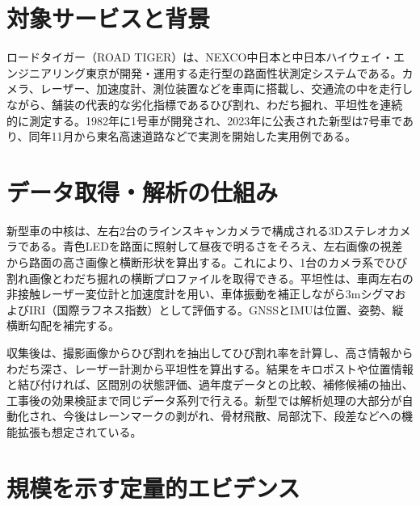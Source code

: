 \documentclass[8pt,a4paper,twocolumn]{ltjsarticle}
\begin{document}

\section{対象サービスと背景}

ロードタイガー（ROAD TIGER）は、NEXCO中日本と中日本ハイウェイ・エンジニアリング東京が開発・運用する走行型の路面性状測定システムである。カメラ、レーザー、加速度計、測位装置などを車両に搭載し、交通流の中を走行しながら、舗装の代表的な劣化指標であるひび割れ、わだち掘れ、平坦性を連続的に測定する。1982年に1号車が開発され、2023年に公表された新型は7号車であり、同年11月から東名高速道路などで実測を開始した実用例である\cite{nexco2023}。

\section{データ取得・解析の仕組み}

新型車の中核は、左右2台のラインスキャンカメラで構成される3Dステレオカメラである。青色LEDを路面に照射して昼夜で明るさをそろえ、左右画像の視差から路面の高さ画像と横断形状を算出する。これにより、1台のカメラ系でひび割れ画像とわだち掘れの横断プロファイルを取得できる。平坦性は、車両左右の非接触レーザー変位計と加速度計を用い、車体振動を補正しながら3mシグマおよびIRI（国際ラフネス指数）として評価する。GNSSとIMUは位置、姿勢、縦横断勾配を補完する\cite{catalog2025,roadtigerpdf}。

収集後は、撮影画像からひび割れを抽出してひび割れ率を計算し、高さ情報からわだち深さ、レーザー計測から平坦性を算出する。結果をキロポストや位置情報と結び付ければ、区間別の状態評価、過年度データとの比較、補修候補の抽出、工事後の効果検証まで同じデータ系列で行える。新型では解析処理の大部分が自動化され、今後はレーンマークの剥がれ、骨材飛散、局部沈下、段差などへの機能拡張も想定されている\cite{nexco2023,catalog2025}。

\section{規模を示す定量的エビデンス}
\end{document}
